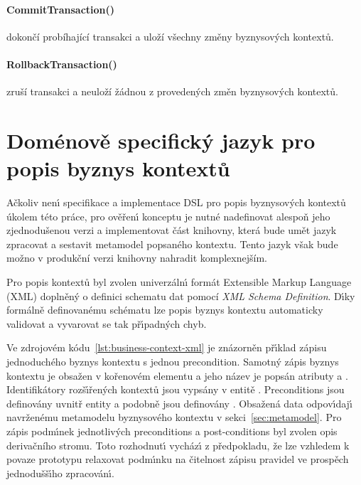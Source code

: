 \paragraph{CommitTransaction()} dokončí probíhající transakci a uloží všechny změny byznysových kontextů.

\paragraph{RollbackTransaction()} zruší transakci a neuloží žádnou z provedených změn byznysových kontextů.

\section{Doménově specifick\'y jazyk pro popis byznys kontextů}\label{sec:dsl-impl}

Ačkoliv nen\'{\i} specifikace a implementace \gls{DSL} pro popis byznysových kontextů
úkolem této práce, pro ověřen\'{\i} konceptu je nutné nadefinovat alespoň jeho zjednodušenou
verzi a implementovat část knihovny, která bude umět jazyk zpracovat a sestavit metamodel popsaného
kontextu. Tento jazyk však bude možno v produkční verzi knihovny nahradit komplexnejším.

Pro popis kontextů byl zvolen univerzáln\'{\i} formát Extensible
Markup Language (\gls{XML}) doplněný o definici schematu dat
pomocí \textit{XML Schema Definition}.
D\'{\i}ky formálně definovanému schématu lze popis byznys kontextu
automaticky validovat a vyvarovat se tak př\'{\i}padn\'ych chyb.

Ve zdrojovém kódu~\ref{lst:business-context-xml} je znázorněn
př\'{\i}klad zápisu jednoduchého byznys kontextu s jednou precondition.
Samotn\'y zápis byznys kontextu je obsažen v kořenovém elementu
 a jeho název je popsán atributy
 a . Identifikátory rozš\'{\i}řených kontextů jsou
vypsány v entitě . Preconditions jsou
definovány uvnitř entity  a podobně
jsou definovány . Obsažená data odpov\'{\i}daj\'{\i}
navrženému metamodelu byznysového kontextu v sekci~\ref{sec:metamodel}.
Pro zápis podm\'{\i}nek jednotliv\'ych preconditions a post-conditions byl zvolen
opis derivačního stromu. Toto rozhodnut\'{\i} vycház\'{\i} z předpokladu,
že lze vzhledem k povaze prototypu relaxovat podm\'{\i}nku
na čitelnost zápisu pravidel ve prospěch jednodušš\'{\i}ho zpracován\'{\i}.

